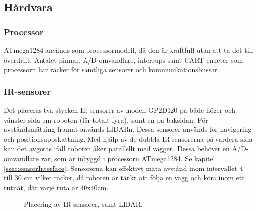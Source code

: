 \documentclass[a4paper,11pt]{article}
\begin{document}
\subsection{Hårdvara}

\subsubsection{Processor}
ATmega1284 används som processormodell, då den är kraftfull utan att ta det till överdrift. Antalet pinnar, A/D-omvandlare, interrups samt UART-enheter som processorn har räcker för samtliga sensorer och kommunikationsbussar.

\subsubsection{IR-sensorer} \label{sssec:sonicsensors}
Det placeras två stycken IR-sensorer av modell GP2D120 på både höger och vänster sida om roboten (för totalt fyra), samt en på baksidan. För avståndsmätning framåt används LIDARn. Dessa sensorer används för navigering och positionsuppskattning. Med hjälp av de dubbla IR-sensorerna på vardera sida kan det avgöras ifall roboten åker parallellt med väggen. Dessa behöver en A/D-omvandlare var, som är inbyggd i processorn ATmega1284. Se kapitel \ref{ssec:sensorInterface}. Sensorerna kan effektivt mäta avstånd inom intervallet 4 till 30 cm vilket räcker, då roboten är tänkt att följa en vägg och köra inom ett rutnät, där varje ruta är 40x40cm.

\begin{figure}[h!]
	\caption{Placering av IR-sensorer, samt LIDAR.}
	\label{fig:unitSensorPlacement}
\end{figure}
\end{document}
